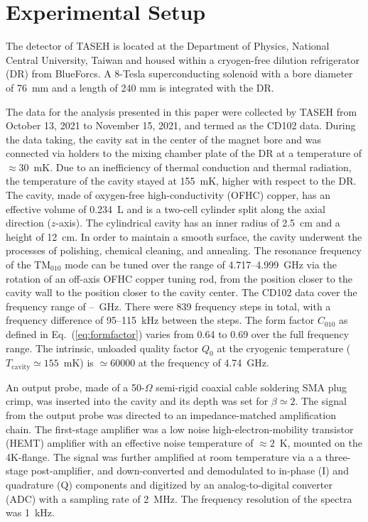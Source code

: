 
\section{Experimental Setup}\label{sec:taseh} 
The detector of TASEH is located at the Department of Physics, National 
Central University, Taiwan and housed within a cryogen-free dilution 
refrigerator (DR) from BlueForcs. A 8-Tesla superconducting solenoid with a 
bore diameter of 76~mm and a length of 240 mm is integrated with the DR. 

The data for the analysis presented in this paper were collected by TASEH 
from October 13, 2021 to November 15, 2021, and termed as the CD102 data. 
During the data taking, the cavity sat in the center of the magnet bore 
and was connected via holders 
to the mixing chamber plate of the DR at a temperature of $\approx$30~mK. 
Due to an inefficiency of thermal conduction and thermal radiation, 
the temperature of the cavity stayed at 155~mK, higher with respect to the DR.
The cavity, made of oxygen-free high-conductivity (OFHC) copper, has an 
effective volume of 0.234~L and is a two-cell cylinder split along 
the axial direction ($z$-axis). 
The cylindrical cavity has an inner radius of 2.5~cm and a 
height of 12~cm.  In order to maintain a smooth surface, the cavity underwent 
the processes of polishing, chemical cleaning, and annealing. The resonance 
frequency of the TM$_{010}$ mode can be tuned over the range of 
4.717--4.999~GHz via the rotation of an off-axis OFHC copper tuning rod, from 
the position closer to the cavity wall to the position closer to the cavity 
center. The CD102 data cover the frequency range of \flo--\fhi~GHz. 
There were 839 frequency steps in total, with a frequency difference of 
95--115~kHz between the steps. The form factor $C_{010}$ as defined in 
Eq.~(\ref{eq:formfactor}) varies from 0.64 to 0.69 over the full frequency range.  
The intrinsic, unloaded quality factor $Q_0$ at the cryogenic temperature 
($T_\mathrm{cavity}\simeq 155$~mK) is $\simeq 60000$ at the frequency of 
4.74~GHz.

An output probe, made of a 50-$\Omega$ semi-rigid coaxial cable 
soldering SMA plug crimp, was inserted into the cavity and its depth was set for 
$\beta\simeq2$.  The signal from the output probe was directed to an 
impedance-matched amplification chain. The first-stage amplifier was 
a low noise high-electron-mobility transistor (HEMT) amplifier with an 
effective noise temperature of $\approx 2$~K, mounted on the 4K-flange. 
The signal was further amplified at room temperature via a 
a three-stage post-amplifier, and down-converted 
and demodulated to in-phase (I) and quadrature (Q) components and digitized 
by an analog-to-digital converter (ADC) with a sampling rate of 2~MHz. 
The frequency resolution of the spectra was 1~kHz.

